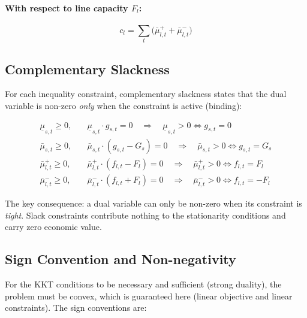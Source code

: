 \documentclass{article}
\begin{document}
\paragraph{With respect to line capacity $F_l$:}
\begin{equation}
    \boxed{c_l = \sum_t \bigl(\bar{\mu}^+_{l,t} + \bar{\mu}^-_{l,t}\bigr)}
    \label{eq:stat_cap_l}
\end{equation}

\subsection{Complementary Slackness}

For each inequality constraint, complementary slackness states that
the dual variable is non-zero \emph{only} when the constraint is
active (binding):

\begin{align}
    \underline{\mu}_{s,t} \ge 0, &\quad \underline{\mu}_{s,t} \cdot g_{s,t} = 0
    \quad \Rightarrow\quad
    \underline{\mu}_{s,t} > 0 \iff g_{s,t} = 0 \label{eq:cs1} \\
    \bar{\mu}_{s,t} \ge 0, &\quad \bar{\mu}_{s,t} \cdot (g_{s,t} - G_s) = 0
    \quad \Rightarrow\quad
    \bar{\mu}_{s,t} > 0 \iff g_{s,t} = G_s \label{eq:cs2} \\
    \bar{\mu}^+_{l,t} \ge 0, &\quad \bar{\mu}^+_{l,t} \cdot (f_{l,t} - F_l) = 0
    \quad \Rightarrow\quad
    \bar{\mu}^+_{l,t} > 0 \iff f_{l,t} = F_l \label{eq:cs3} \\
    \bar{\mu}^-_{l,t} \ge 0, &\quad \bar{\mu}^-_{l,t} \cdot (f_{l,t} + F_l) = 0
    \quad \Rightarrow\quad
    \bar{\mu}^-_{l,t} > 0 \iff f_{l,t} = -F_l \label{eq:cs4}
\end{align}

The key consequence: a dual variable can only be non-zero when its constraint is \emph{tight}.
Slack constraints contribute nothing to the stationarity conditions and carry
zero economic value.

\subsection{Sign Convention and Non-negativity}

For the KKT conditions to be necessary and sufficient (strong duality), the
problem must be convex, which is guaranteed here (linear objective and linear
constraints). The sign conventions are:
\end{document}
